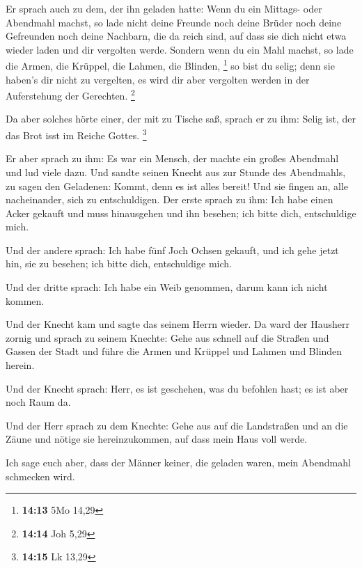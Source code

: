  Er sprach auch zu dem, der ihn geladen hatte: Wenn du
ein Mittags- oder Abendmahl machst, so lade nicht deine Freunde noch
deine Brüder noch deine Gefreunden noch deine Nachbarn, die da reich
sind, auf dass sie dich nicht etwa wieder laden und dir vergolten werde.
 Sondern wenn du ein Mahl machst, so lade die Armen, die
Krüppel, die Lahmen, die Blinden, \footnote{\textbf{14:13} 5Mo 14,29}
 so bist du selig; denn sie haben's dir nicht zu
vergelten, es wird dir aber vergolten werden in der Auferstehung der
Gerechten. \footnote{\textbf{14:14} Joh 5,29}

 Da aber solches hörte einer, der mit zu Tische saß,
sprach er zu ihm: Selig ist, der das Brot isst im Reiche Gottes.
\footnote{\textbf{14:15} Lk 13,29}

 Er aber sprach zu ihm: Es war ein Mensch, der machte ein
großes Abendmahl und lud viele dazu.  Und sandte seinen
Knecht aus zur Stunde des Abendmahls, zu sagen den Geladenen: Kommt,
denn es ist alles bereit!  Und sie fingen an, alle
nacheinander, sich zu entschuldigen. Der erste sprach zu ihm: Ich habe
einen Acker gekauft und muss hinausgehen und ihn besehen; ich bitte
dich, entschuldige mich.

 Und der andere sprach: Ich habe fünf Joch Ochsen
gekauft, und ich gehe jetzt hin, sie zu besehen; ich bitte dich,
entschuldige mich.

 Und der dritte sprach: Ich habe ein Weib genommen, darum
kann ich nicht kommen.

 Und der Knecht kam und sagte das seinem Herrn wieder. Da
ward der Hausherr zornig und sprach zu seinem Knechte: Gehe aus schnell
auf die Straßen und Gassen der Stadt und führe die Armen und Krüppel und
Lahmen und Blinden herein.

 Und der Knecht sprach: Herr, es ist geschehen, was du
befohlen hast; es ist aber noch Raum da.

 Und der Herr sprach zu dem Knechte: Gehe aus auf die
Landstraßen und an die Zäune und nötige sie hereinzukommen, auf dass
mein Haus voll werde.

 Ich sage euch aber, dass der Männer keiner, die geladen
waren, mein Abendmahl schmecken wird.

